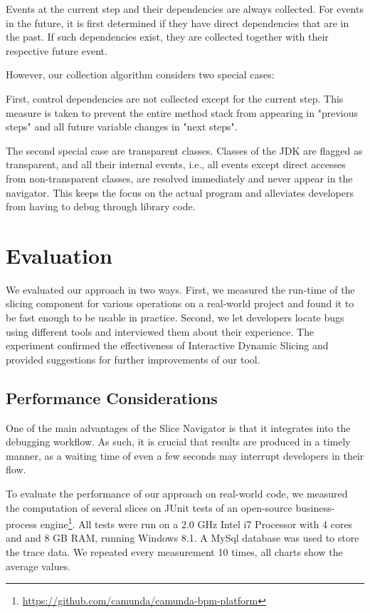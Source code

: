 \documentclass[
			english,
			review,
			]{elsarticle}
\begin{document}
Events at the current step and their dependencies are always collected.
For events in the future, it is first determined if they have direct dependencies that are in the past.
If such dependencies exist, they are collected together with their respective future event.

However, our collection algorithm considers two special cases:

First, control dependencies are not collected except for the current step.
This measure is taken to prevent the entire method stack from appearing in "previous steps" and all future variable changes in "next steps".

The second special case are transparent classes.
Classes of the JDK are flagged as transparent, and all their internal events, i.e., all events except direct accesses from non-transparent classes, are resolved immediately and never appear in the navigator.
This keeps the focus on the actual program and alleviates developers from having to debug through library code.

\section{Evaluation}
\label{sec:eval}

We evaluated our approach in two ways.
First, we measured the run-time of the slicing component for various operations on a real-world project and found it to be fast enough to be usable in practice.
Second, we let developers locate bugs using different tools and interviewed them about their experience.
The experiment confirmed the effectiveness of Interactive Dynamic Slicing and provided suggestions for further improvements of our tool.

\subsection{Performance Considerations}

One of the main advantages of the Slice Navigator is that it integrates into the debugging workflow.
As such, it is crucial that results are produced in a timely manner, as a waiting time of even a few seconds may interrupt developers in their flow.

To evaluate the performance of our approach on real-world code, we measured the computation of several slices on JUnit tests of an open-source business-process engine\footnote{\url{https://github.com/camunda/camunda-bpm-platform}}.
All tests were run on a 2.0 GHz Intel i7 Processor with 4 cores and and 8 GB RAM, running Windows 8.1.
A MySql database was used to store the trace data.
We repeated every measurement 10 times, all charts show the average values.
\end{document}
